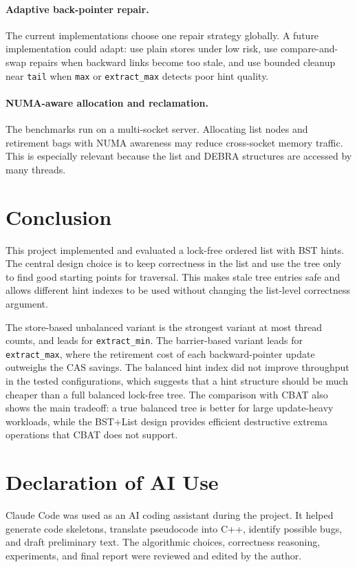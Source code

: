 \documentclass[a4paper,11pt]{article}
\newcommand{\code}[1]{\texttt{#1}}
\begin{document}
\paragraph{Adaptive back-pointer repair.}
The current implementations choose one repair strategy globally. A future implementation could adapt: use plain stores under low risk, use compare-and-swap repairs when backward links become too stale, and use bounded cleanup near \code{tail} when \code{max} or \code{extract\_max} detects poor hint quality.

\paragraph{NUMA-aware allocation and reclamation.}
The benchmarks run on a multi-socket server. Allocating list nodes and retirement bags with NUMA awareness may reduce cross-socket memory traffic. This is especially relevant because the list and DEBRA structures are accessed by many threads.

\section{Conclusion}

This project implemented and evaluated a lock-free ordered list with BST hints. The central design choice is to keep correctness in the list and use the tree only to find good starting points for traversal. This makes stale tree entries safe and allows different hint indexes to be used without changing the list-level correctness argument.

The store-based unbalanced variant is the strongest variant at most thread counts, and leads for \code{extract\_min}. The barrier-based variant leads for \code{extract\_max}, where the retirement cost of each backward-pointer update outweighs the CAS savings. The balanced hint index did not improve throughput in the tested configurations, which suggests that a hint structure should be much cheaper than a full balanced lock-free tree. The comparison with CBAT also shows the main tradeoff: a true balanced tree is better for large update-heavy workloads, while the BST+List design provides efficient destructive extrema operations that CBAT does not support.

\section*{Declaration of AI Use}

Claude Code was used as an AI coding assistant during the project. It helped generate code skeletons, translate pseudocode into C++, identify possible bugs, and draft preliminary text. The algorithmic choices, correctness reasoning, experiments, and final report were reviewed and edited by the author.
\end{document}

